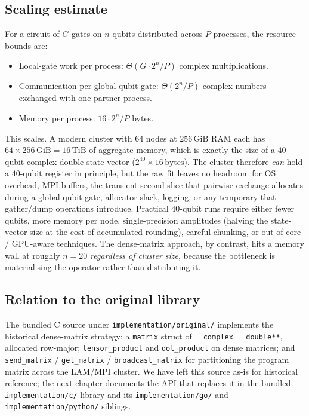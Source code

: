 \subsection{Scaling estimate}

For a circuit of $G$ gates on $n$ qubits distributed across $P$ processes, the resource bounds are:
\begin{itemize}
\item Local-gate work per process: $\Theta(G\cdot 2^n / P)$ complex multiplications.
\item Communication per global-qubit gate: $\Theta(2^n / P)$ complex numbers exchanged with one partner process.
\item Memory per process: $16 \cdot 2^n / P$ bytes.
\end{itemize}
This scales. A modern cluster with $64$ nodes at $256\,\text{GiB}$ RAM each has $64 \times 256\,\text{GiB} = 16\,\text{TiB}$ of aggregate memory, which is exactly the size of a $40$-qubit complex-double state vector ($2^{40} \times 16\,\text{bytes}$). The cluster therefore \emph{can} hold a $40$-qubit register in principle, but the raw fit leaves no headroom for OS overhead, MPI buffers, the transient second slice that pairwise exchange allocates during a global-qubit gate, allocator slack, logging, or any temporary that gather/dump operations introduce. Practical $40$-qubit runs require either fewer qubits, more memory per node, single-precision amplitudes (halving the state-vector size at the cost of accumulated rounding), careful chunking, or out-of-core / GPU-aware techniques. The dense-matrix approach, by contrast, hits a memory wall at roughly $n=20$ \emph{regardless of cluster size}, because the bottleneck is materialising the operator rather than distributing it.

\subsection{Relation to the original library}

\begin{sloppypar}
The bundled C source under \texttt{implementation/original/} implements the historical dense-matrix strategy: a \texttt{matrix} struct of \texttt{\_\_complex\_\_ double**}, allocated row-major; \texttt{tensor\_product} and \texttt{dot\_product} on dense matrices; and \texttt{send\_matrix} / \texttt{get\_matrix} / \texttt{broadcast\_matrix} for partitioning the program matrix across the LAM/MPI cluster. We have left this source as-is for historical reference; the next chapter documents the API that replaces it in the bundled \texttt{implementation/c/} library and its \texttt{implementation/go/} and \texttt{implementation/python/} siblings.
\end{sloppypar}
